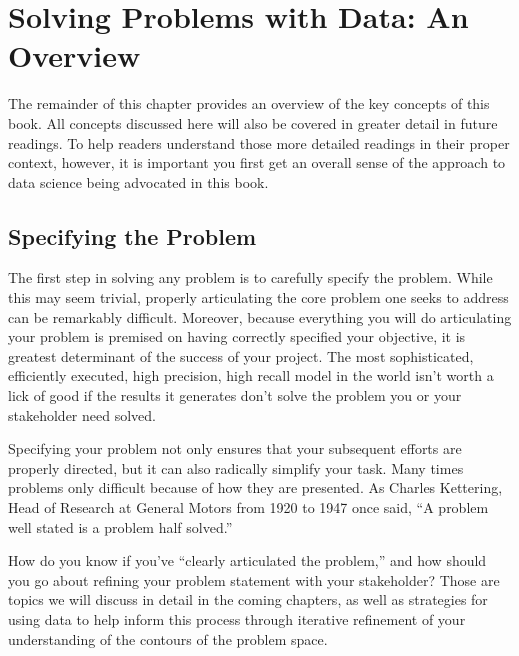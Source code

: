 \documentclass[letterpaper,10pt,english]{jupyterBook}
\begin{document}
\section{Solving Problems with Data: An Overview}
\label{\detokenize{10_introduction/10_our_approach:solving-problems-with-data-an-overview}}
\sphinxAtStartPar
The remainder of this chapter provides an overview of the key concepts of this book. All concepts discussed here will also be covered in greater detail in future readings. To help readers understand those more detailed readings in their proper context, however, it is important you first get an overall sense of the approach to data science being advocated in this book.


\subsection{Specifying the Problem}
\label{\detokenize{10_introduction/10_our_approach:specifying-the-problem}}
\sphinxAtStartPar
The first step in solving any problem is  to carefully specify the problem. While this may seem trivial, properly articulating the core problem one seeks to address can be remarkably difficult. Moreover, because everything you will do  articulating your problem is premised on having correctly specified your objective, it is  greatest determinant of the success of your project. The most sophisticated, efficiently executed, high precision, high recall model in the world isn’t worth a lick of good if the results it generates don’t solve the problem you or your stakeholder need solved.

\sphinxAtStartPar
Specifying your problem not only ensures that your subsequent efforts are properly directed, but it can also radically simplify your task. Many times problems only  difficult because of how they are presented. As Charles Kettering, Head of Research at General Motors from 1920 to 1947 once said, “A problem well stated is a problem half solved.”

\sphinxAtStartPar
How do you know if you’ve “clearly articulated the problem,” and how should you go about refining your problem statement with your stakeholder? Those are topics we will discuss in detail in the coming chapters, as well as strategies for using data to help inform this process through iterative refinement of your understanding of the contours of the problem space.
\end{document}
